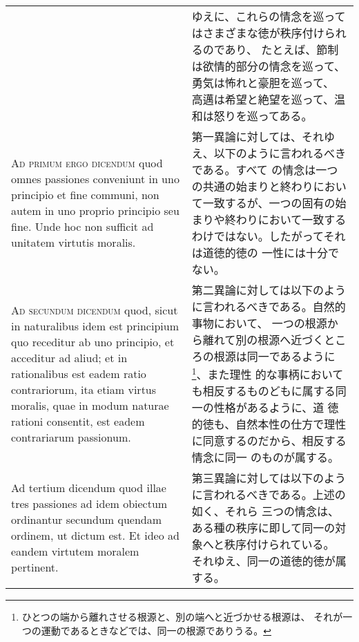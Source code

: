 \documentclass[10pt]{jsarticle}
\begin{document}
\begin{longtable}{p{21em}p{21em}}
 &

 ゆえに、これらの情念を巡ってはさまざまな徳が秩序付けられるのであり、
 たとえば、節制は欲情的部分の情念を巡って、勇気は怖れと豪胆を巡って、
 高邁は希望と絶望を巡って、温和は怒りを巡ってある。
 
 \\
 


 {\scshape Ad primum ergo dicendum} quod omnes passiones conveniunt in
 uno principio et fine communi, non autem in uno proprio principio seu
 fine. Unde hoc non sufficit ad unitatem virtutis moralis.
 
&

 第一異論に対しては、それゆえ、以下のように言われるべきである。すべて
 の情念は一つの共通の始まりと終わりにおいて一致するが、一つの固有の始
 まりや終わりにおいて一致するわけではない。したがってそれは道徳的徳の
 一性には十分でない。
 
\\

 {\scshape Ad secundum dicendum} quod, sicut in naturalibus idem est
 principium quo receditur ab uno principio, et acceditur ad aliud; et
 in rationalibus est eadem ratio contrariorum, ita etiam virtus
 moralis, quae in modum naturae rationi consentit, est eadem
 contrariarum passionum.
 
&

 第二異論に対しては以下のように言われるべきである。自然的事物において、
 一つの根源から離れて別の根源へ近づくところの根源は同一であるように
 \footnote{ひとつの端から離れさせる根源と、別の端へと近づかせる根源は、
 それが一つの運動であるときなどでは、同一の根源でありうる。}、また理性
 的な事柄においても相反するものどもに属する同一の性格があるように、道
 徳的徳も、自然本性の仕方で理性に同意するのだから、相反する情念に同一
 のものが属する。

 \\

 Ad tertium dicendum quod illae tres passiones ad idem obiectum
 ordinantur secundum quendam ordinem, ut dictum est. Et ideo ad eandem
 virtutem moralem pertinent.
 
&

 第三異論に対しては以下のように言われるべきである。上述の如く、それら
 三つの情念は、ある種の秩序に即して同一の対象へと秩序付けられている。
 それゆえ、同一の道徳的徳が属する。

 
\\



\end{longtable}
\newpage
\end{document}
